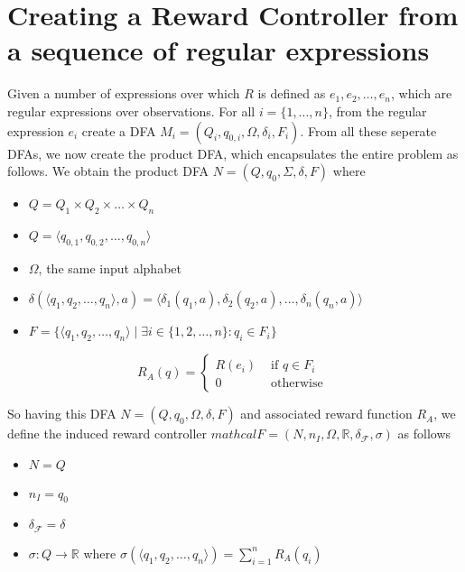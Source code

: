 \section{Creating a Reward Controller from a sequence of regular expressions}
Given a number of expressions over which $R$ is defined as $e_1,e_2,\dots,e_n$, which are regular expressions over observations.
For all $i=\{1,\dots, n\}$, from the regular expression $e_i$ create a DFA $M_i=(Q_i,q_{0,i},\Omega, \delta_i,F_i)$. From all these seperate DFAs, we now create the product DFA, which encapsulates the entire problem as follows. We obtain the product DFA $N=(Q,q_0,\Sigma,\delta,F)$ where 
\begin{itemize}
\item $Q = Q_1 \times Q_2 \times \dots \times Q_n$
\item $Q = \langle q_{0,1}, q_{0,2}, \dots, q_{0,n}\rangle$
\item $\Omega$, the same input alphabet
\item $\delta(\langle q_1,q_2,\dots,q_n\rangle,a)= \langle \delta_1(q_1,a), \delta_2(q_2,a),\dots,\delta_n(q_n,a)\rangle$
\item $F=\{\langle q_1,q_2,\dots,q_n\rangle \mid \exists i \in \{1,2,\dots,n\} : q_i\in F_i\}$
\end{itemize}


\begin{equation*}
R_A(q) = \begin{cases}
R(e_i) & \text{ if } q\in F_i \\
0 & \text{ otherwise }
\end{cases}
\end{equation*}

\begin{definition}
So having this DFA $N=(Q,q_0,\Omega,\delta,F)$ and associated reward function $R_A$, we define the induced reward controller $mathcal{F}=(N,n_I,\Omega, \mathbb{R}, \delta_\mathcal{F},\sigma)$ as follows
\begin{itemize}
\item $N=Q$
\item $n_I=q_0$
\item $\delta_\mathcal{F}=\delta$
\item $\sigma: Q\to\mathbb{R}$ where $\sigma(\langle q_1,q_2,\dots, q_n\rangle) = \sum\limits _{i=1}^n R_A(q_i)$
\end{itemize}
\end{definition}

